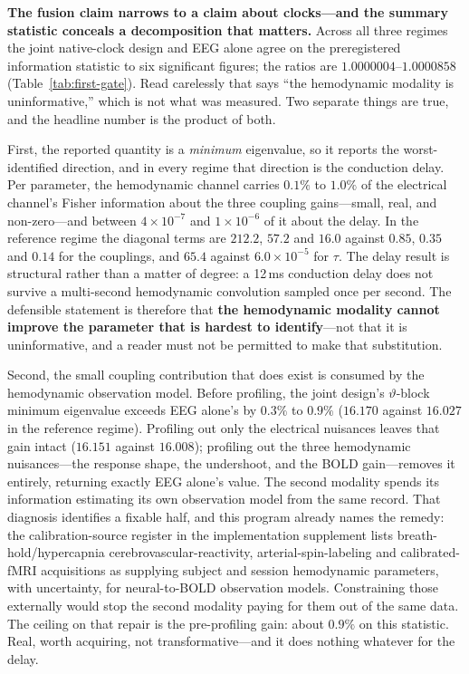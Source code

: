 \textbf{The fusion claim narrows to a claim about clocks---and the summary
statistic conceals a decomposition that matters.} Across all three regimes the
joint native-clock design and EEG alone agree on the preregistered information
statistic to six significant figures; the ratios are
\(1.0000004\)--\(1.0000858\) (Table~\ref{tab:first-gate}). Read carelessly that
says ``the hemodynamic modality is uninformative,'' which is not what was
measured. Two separate things are true, and the headline number is the product
of both.

First, the reported quantity is a \emph{minimum} eigenvalue, so it reports the
worst-identified direction, and in every regime that direction is the
conduction delay. Per parameter, the hemodynamic channel carries \(0.1\%\) to
\(1.0\%\) of the electrical channel's Fisher information about the three
coupling gains---small, real, and non-zero---and between \(4\times10^{-7}\) and
\(1\times10^{-6}\) of it about the delay. In the reference regime the diagonal
terms are \(212.2\), \(57.2\) and \(16.0\) against \(0.85\), \(0.35\) and
\(0.14\) for the couplings, and \(65.4\) against \(6.0\times10^{-5}\) for
\(\tau\). The delay result is structural rather than a matter of degree: a
12\,ms conduction delay does not survive a multi-second hemodynamic convolution
sampled once per second. The defensible statement is therefore that
\textbf{the hemodynamic modality cannot improve the parameter that is hardest
to identify}---not that it is uninformative, and a reader must not be permitted
to make that substitution.

Second, the small coupling contribution that does exist is consumed by the
hemodynamic observation model. Before profiling, the joint design's
\(\vartheta\)-block minimum eigenvalue exceeds EEG alone's by \(0.3\%\) to
\(0.9\%\) (\(16.170\) against \(16.027\) in the reference regime). Profiling out
only the electrical nuisances leaves that gain intact (\(16.151\) against
\(16.008\)); profiling out the three hemodynamic nuisances---the response shape,
the undershoot, and the BOLD gain---removes it entirely, returning exactly EEG
alone's value. The second modality spends its information estimating its own
observation model from the same record. That diagnosis identifies a fixable
half, and this program already names the remedy: the calibration-source register
in the implementation supplement lists breath-hold/hypercapnia
cerebrovascular-reactivity, arterial-spin-labeling and calibrated-fMRI
acquisitions as supplying subject and session hemodynamic parameters, with
uncertainty, for neural-to-BOLD observation models. Constraining those
externally would stop the second modality paying for them out of the same data.
The ceiling on that repair is the pre-profiling gain: about \(0.9\%\) on this
statistic. Real, worth acquiring, not transformative---and it does nothing
whatever for the delay.

